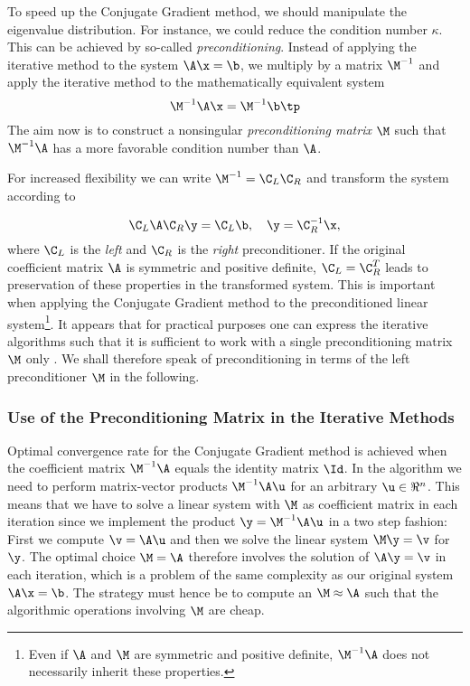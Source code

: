 To speed up the Conjugate Gradient method, we should
manipulate the eigenvalue distribution. For instance, we could reduce
the condition number $\kappa$. This can be achieved by so-called
\emph{preconditioning}. Instead of applying the iterative method to
the system $\A\x =\b$, we multiply by a matrix $\M^{-1}$ and
apply the iterative method to the mathematically equivalent system
\begin{equation} \M^{-1}\A\x = \M^{-1}\b \tp\end{equation}
The aim now is to construct a nonsingular \emph{preconditioning matrix}
  $\M$  such that $\M^{-1}\A$
has a more favorable condition number than $\A$.

\label{ch:linalg:CLandCR}
For increased flexibility we can write
$\M^{-1} = \C_L\C_R$ and transform the system according to

\begin{equation}
\C_L\A\C_R\y = \C_L\b,\quad \y =\C_R^{-1}\x ,
\end{equation}
where $\C_L$ is the \emph{left} and $\C_R$ is the \emph{right}
preconditioner. If the original coefficient matrix
$\A$ is symmetric and positive definite,
$\C_L = \C_R^T$ leads to preservation of these properties in the
transformed system. This is important when applying the Conjugate
Gradient method to the preconditioned linear system\footnote{Even if
$\A$ and $\M$ are symmetric and positive definite, $\M^{-1}\A$ does
not necessarily inherit these properties.}.
It appears that for practical purposes one
can express the iterative algorithms
such that it is sufficient to work with a single preconditioning matrix
$\M$ only \cite{linalgtemplates93,BruBok}.
We shall therefore speak of preconditioning in terms of the
left preconditioner $\M$ in the following.

\subsubsection{Use of the Preconditioning Matrix in the Iterative Methods}

Optimal convergence rate for the Conjugate Gradient method is
achieved when the coefficient matrix $\M^{-1}\A$ equals the identity matrix
$\Id$. In the algorithm we need to perform matrix-vector products
$\M^{-1}\A\u$ for an arbitrary $\u\in\Re^n$.
This means that we have to solve a linear system with $\M$ as coefficient
matrix in each iteration since we implement the product $\y =\M^{-1}\A\u$
in a two step fashion: First we compute $\v = \A\u$ and then we
solve the linear system $\M\y =\v$ for $\y$. The optimal choice $\M =\A$
therefore involves the solution of $\A\y =\v$ in each iteration, which
is a problem of the same complexity as our original system $\A\x =\b$.
The strategy must hence be to compute an $\M\approx \A$ such that the
algorithmic operations involving $\M$ are cheap.

